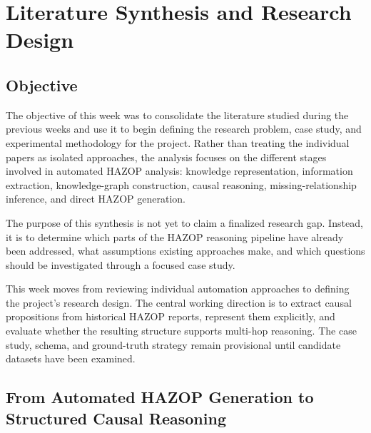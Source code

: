 %
%

\chapter[Literature Synthesis and Research Design]
{Literature Synthesis and Research Design}

\section{Objective}

The objective of this week was to consolidate the literature studied during
the previous weeks and use it to begin defining the research problem, case
study, and experimental methodology for the project. Rather than treating
the individual papers as isolated approaches, the analysis focuses on the
different stages involved in automated HAZOP analysis: knowledge
representation, information extraction, knowledge-graph construction,
causal reasoning, missing-relationship inference, and direct HAZOP
generation.

The purpose of this synthesis is not yet to claim a finalized research gap.
Instead, it is to determine which parts of the HAZOP reasoning pipeline have
already been addressed, what assumptions existing approaches make, and which
questions should be investigated through a focused case study.

\begin{glance}
This week moves from reviewing individual automation approaches to defining
the project's research design. The central working direction is to extract
causal propositions from historical HAZOP reports, represent them explicitly,
and evaluate whether the resulting structure supports multi-hop reasoning.
The case study, schema, and ground-truth strategy remain provisional until
candidate datasets have been examined.
\end{glance}

\section{From Automated HAZOP Generation to Structured Causal Reasoning}

